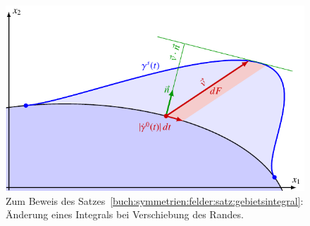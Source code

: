 %
%
%
\begin{figure}
\centering
\includegraphics{chapters/100-symmetrien/images/rand.pdf}
\caption{Zum Beweis des
Satzes~\ref{buch:symmetrien:felder:satz:gebietsintegral}:
Änderung eines Integrals bei Verschiebung des Randes.
\label{buch:symmetrien:felder:fig:rand}}
\end{figure}
